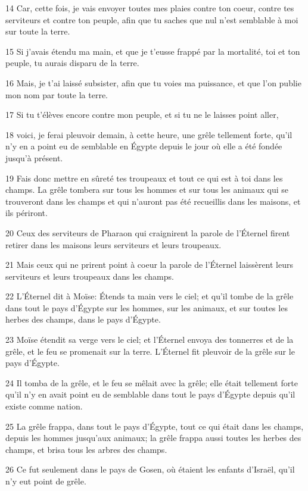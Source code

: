 \par 14 Car, cette fois, je vais envoyer toutes mes plaies contre ton coeur, contre tes serviteurs et contre ton peuple, afin que tu saches que nul n'est semblable à moi sur toute la terre.
\par 15 Si j'avais étendu ma main, et que je t'eusse frappé par la mortalité, toi et ton peuple, tu aurais disparu de la terre.
\par 16 Mais, je t'ai laissé subsister, afin que tu voies ma puissance, et que l'on publie mon nom par toute la terre.
\par 17 Si tu t'élèves encore contre mon peuple, et si tu ne le laisses point aller,
\par 18 voici, je ferai pleuvoir demain, à cette heure, une grêle tellement forte, qu'il n'y en a point eu de semblable en Égypte depuis le jour où elle a été fondée jusqu'à présent.
\par 19 Fais donc mettre en sûreté tes troupeaux et tout ce qui est à toi dans les champs. La grêle tombera sur tous les hommes et sur tous les animaux qui se trouveront dans les champs et qui n'auront pas été recueillis dans les maisons, et ils périront.
\par 20 Ceux des serviteurs de Pharaon qui craignirent la parole de l'Éternel firent retirer dans les maisons leurs serviteurs et leurs troupeaux.
\par 21 Mais ceux qui ne prirent point à coeur la parole de l'Éternel laissèrent leurs serviteurs et leurs troupeaux dans les champs.
\par 22 L'Éternel dit à Moïse: Étends ta main vers le ciel; et qu'il tombe de la grêle dans tout le pays d'Égypte sur les hommes, sur les animaux, et sur toutes les herbes des champs, dans le pays d'Égypte.
\par 23 Moïse étendit sa verge vers le ciel; et l'Éternel envoya des tonnerres et de la grêle, et le feu se promenait sur la terre. L'Éternel fit pleuvoir de la grêle sur le pays d'Égypte.
\par 24 Il tomba de la grêle, et le feu se mêlait avec la grêle; elle était tellement forte qu'il n'y en avait point eu de semblable dans tout le pays d'Égypte depuis qu'il existe comme nation.
\par 25 La grêle frappa, dans tout le pays d'Égypte, tout ce qui était dans les champs, depuis les hommes jusqu'aux animaux; la grêle frappa aussi toutes les herbes des champs, et brisa tous les arbres des champs.
\par 26 Ce fut seulement dans le pays de Gosen, où étaient les enfants d'Israël, qu'il n'y eut point de grêle.
